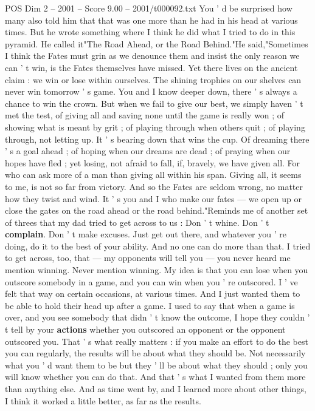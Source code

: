 \begin{textsample}{POS Dim 2 – 2001 – Score 9.00 – 2001/t000092.txt}
You ' d be surprised how many also told him that that was one more than he had in his head at various times.
But he wrote something where I think he did what I tried to do in this pyramid.
He called it"The Road Ahead, or the Road Behind."He said,"Sometimes I think the Fates must grin as we denounce them and insist the only reason we can ' t win, is the Fates themselves have missed.
Yet there lives on the ancient claim : we win or lose within ourselves.
The shining trophies on our shelves can never win tomorrow ' s game.
You and I know deeper down, there ' s always a chance to win the crown.
But when we fail to give our best, we simply haven ' t met the test, of giving all and saving none until the game is really won ; of showing what is meant by grit ; of playing through when others quit ; of playing through, not letting up.
It ' s bearing down that wins the cup.
Of dreaming there ' s a goal ahead ; of hoping when our dreams are dead ; of praying when our hopes have fled ; yet losing, not afraid to fall, if, bravely, we have given all.
For who can ask more of a man than giving all within his span.
Giving all, it seems to me, is not so far from victory.
And so the Fates are seldom wrong, no matter how they twist and wind.
It ' s you and I who make our fates — we open up or close the gates on the road ahead or the road behind."Reminds me of another set of threes that my dad tried to get across to us : Don ' t whine.
Don ' t \textbf{complain}.
Don ' t make excuses.
Just get out there, and whatever you ' re doing, do it to the best of your ability.
And no one can do more than that.
I tried to get across, too, that — my opponents will tell you — you never heard me mention winning.
Never mention winning.
My idea is that you can lose when you outscore somebody in a game, and you can win when you ' re outscored.
I ' ve felt that way on certain occasions, at various times.
And I just wanted them to be able to hold their head up after a game.
I used to say that when a game is over, and you see somebody that didn ' t know the outcome, I hope they couldn ' t tell by your \textbf{actions} whether you outscored an opponent or the opponent outscored you.
That ' s what really matters : if you make an effort to do the best you can regularly, the results will be about what they should be.
Not necessarily what you ' d want them to be but they ' ll be about what they should ; only you will know whether you can do that.
And that ' s what I wanted from them more than anything else.
And as time went by, and I learned more about other things, I think it worked a little better, as far as the results.

\end{textsample}
